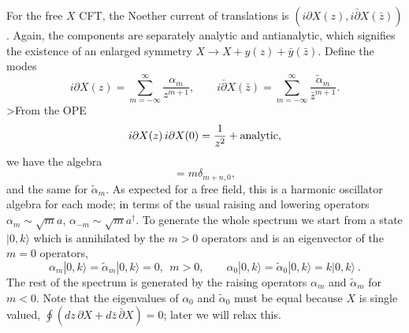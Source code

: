 For the free $X$ CFT, the Noether current of translations is
$(i\partial X(z), i\bar \partial X(\bar z))$.  Again, the
components are separately analytic and antianalytic, which
signifies the existence of an enlarged symmetry $X \to X + y(z) +
\bar y(\bar z)$.
Define the modes
\begin{equation}
i\partial X(z) =
\sum_{m=-\infty}^{\infty} \frac{\alpha_m}{z^{m+1}}, \qquad
i\bar\partial X(\bar z) =\sum_{m = -\infty  }^\infty
\frac{\tilde\alpha_m}{\bar z^{m+1}}. \label{lex1}
\end{equation}
>From the OPE
\begin{equation}
i\partial X(z)\, i\partial X(0) = \frac{1}{z^2} + {\rm analytic},
\end{equation}
we have the algebra
\begin{equation}
[\alpha_m, \alpha_n] = m \delta_{m+n,0},
\end{equation}
and the same for $\tilde \alpha_m$.  As expected for a free field,
this is a harmonic oscillator algebra for each mode; in terms of the
usual raising and lowering operators $\alpha_m \sim \sqrt m a$,
$\alpha_{-m} \sim \sqrt m a^\dagger$.
To generate the whole spectrum we
start from a state $|0,k\rangle$ which is annihilated by the $m > 0$
operators and is an eigenvector of the $m=0$ operators,
\begin{equation}
\alpha_m |0,k\rangle = \tilde \alpha_m |0,k\rangle = 0,
\ \ m>0, \qquad \alpha_0 |0,k\rangle = \tilde\alpha_0
|0,k\rangle = k |0,k\rangle\ .
\end{equation}
The rest of the spectrum is generated by the raising operators
$\alpha_m$ and $\tilde \alpha_m$ for $m < 0$.  Note that the
eigenvalues of $\alpha_0$ and $\tilde\alpha_0$ must be equal because
$X$ is single valued, $\oint (dz\, \partial X + d\bar z\,\bar\partial
X) = 0$; later we will relax this.

